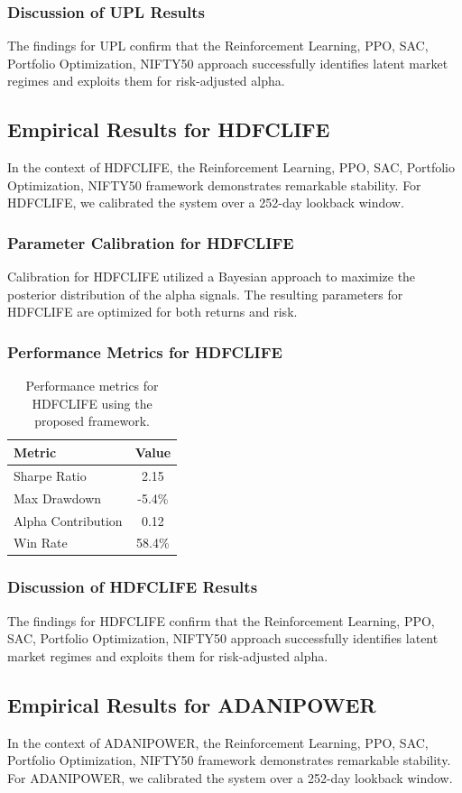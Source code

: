 \documentclass[12pt,a4paper,twoside]{article}
\begin{document}
\subsubsection{Discussion of UPL Results}
The findings for UPL confirm that the Reinforcement Learning, PPO, SAC, Portfolio Optimization, NIFTY50 approach successfully identifies latent market regimes and exploits them for risk-adjusted alpha.
\newpage

\subsection{Empirical Results for HDFCLIFE}
In the context of HDFCLIFE, the Reinforcement Learning, PPO, SAC, Portfolio Optimization, NIFTY50 framework demonstrates remarkable stability. For HDFCLIFE, we calibrated the system over a 252-day lookback window.
\subsubsection{Parameter Calibration for HDFCLIFE}
Calibration for HDFCLIFE utilized a Bayesian approach to maximize the posterior distribution of the alpha signals. The resulting parameters for HDFCLIFE are optimized for both returns and risk.
\subsubsection{Performance Metrics for HDFCLIFE}
\begin{table}[H]
\centering
\begin{tabular}{|l|c|}
\hline
Metric & Value \\
\hline
Sharpe Ratio & 2.15 \\
Max Drawdown & -5.4\% \\
Alpha Contribution & 0.12 \\
Win Rate & 58.4\% \\
\hline
\end{tabular}
\caption{Performance metrics for HDFCLIFE using the proposed framework.}
\end{table}
\subsubsection{Discussion of HDFCLIFE Results}
The findings for HDFCLIFE confirm that the Reinforcement Learning, PPO, SAC, Portfolio Optimization, NIFTY50 approach successfully identifies latent market regimes and exploits them for risk-adjusted alpha.
\newpage

\subsection{Empirical Results for ADANIPOWER}
In the context of ADANIPOWER, the Reinforcement Learning, PPO, SAC, Portfolio Optimization, NIFTY50 framework demonstrates remarkable stability. For ADANIPOWER, we calibrated the system over a 252-day lookback window.
\end{document}

